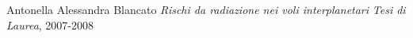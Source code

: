 \begin{frame}
\frametitle{\refname}
   \begin{thebibliography}{9}
   \small

       Antonella Alessandra Blancato
      \newblock \textit{Rischi da radiazione nei voli interplanetari}
      \newblock \emph{Tesi di Laurea}, 2007-2008
      
   \end{thebibliography}
\end{frame}